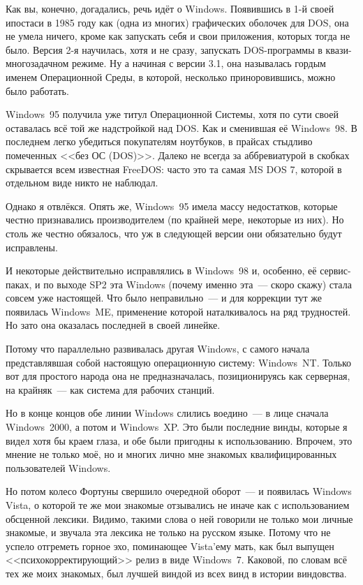 Как вы, конечно, догадались, речь идёт о Windows. Появившись в 1-й своей ипостаси в 1985 году как (одна из многих) графических оболочек для DOS, она не умела ничего, кроме как запускать себя и свои приложения, которых тогда не было. Версия 2-я научилась, хотя и не сразу, запускать DOS-программы в квази-многозадачном режиме. Ну а начиная с версии 3.1, она называлась гордым именем Операционной Среды, в которой, несколько приноровившись, можно было работать.

Windows~95 получила уже титул Операционной Системы, хотя по сути своей оставалась всё той же надстройкой над DOS. Как и сменившая её Windows~98. В последнем легко убедиться покупателям ноутбуков, в прайсах стыдливо помеченных <<без ОС (DOS)>>. Далеко не всегда за аббревиатурой в скобках скрывается всем известная FreeDOS: часто это та самая MS DOS 7, которой в отдельном виде никто не наблюдал.

Однако я отвлёкся. Опять же, Windows~95 имела массу недостатков, которые честно признавались производителем (по крайней мере, некоторые из них). Но столь же честно обязалось, что уж в следующей версии они обязательно будут исправлены.

И некоторые действительно исправлялись в Windows~98 и, особенно, её сервис-паках, и по выходе SP2 эта Windows (почему именно эта~--- скоро скажу) стала совсем уже настоящей. Что было неправильно~--- и для коррекции тут же появилась Windows~ME, применение которой наталкивалось на ряд трудностей. Но зато она оказалась последней в своей линейке.

Потому что параллельно развивалась другая Windows, с самого начала представлявшая собой настоящую операционную систему: Windows~NT. Только вот для простого народа она не предназначалась, позиционируясь как серверная, на крайняк~--- как система для рабочих станций.

Но в конце концов обе линии Windows слились воедино~--- в лице сначала Windows~2000, а потом и Windows~XP. Это были последние винды, которые я видел хотя бы краем глаза, и обе были пригодны к использованию. Впрочем, это мнение не только моё, но и многих лично мне знакомых квалифицированных пользователей Windows.

Но потом колесо Фортуны свершило очередной оборот~--- и появилась Windows Vista, о которой те же мои знакомые отзывались не иначе как с использованием обсценной лексики. Видимо, такими слова о ней говорили не только мои личные знакомые, и звучала эта лексика не только на русском языке. Потому что не успело отгреметь горное эхо, поминающее Vista'ему мать, как был выпущен <<психокорректирующий>> релиз в виде Windows~7. Каковой, по словам всё тех же моих знакомых, был лучшей виндой из всех винд в истории виндовства.

